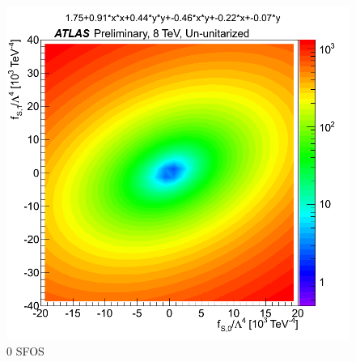 \begin{figure}[tb]
\centering
\includegraphics[width=.7\textwidth]{figures/aqgc_fits/0SFOS/3lUnUnit_0SFOS.png}
\caption{0 SFOS}
\label{fig:aqgc_fit_0sfos_ununit}
\end{figure}

